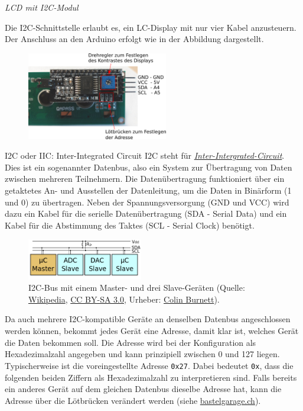 \newpage
\emph{LCD mit I2C-Modul}

Die I2C-Schnittstelle erlaubt es, ein LC-Display mit nur vier Kabel anzusteuern. Der Anschluss an den Arduino erfolgt wie in der Abbildung dargestellt.

\begin{figure}[H]
	\centering
	\includegraphics[width=0.55\textwidth]{./pics/i2c-modul-beschriftet.png}
\end{figure}

\begin{zsfg}{I2C oder IIC: Inter-Integrated Circuit}
	I2C steht für \emph{\href{https://de.wikipedia.org/wiki/I\%C2\%B2C}{Inter-Intergrated-Circuit}}. Dies ist ein sogenannter Datenbus, also ein System zur Übertragung von Daten zwischen mehreren Teilnehmern. Die Datenübertragung funktioniert über ein getaktetes An- und Ausstellen der Datenleitung, um die Daten in Binärform (1 und 0) zu übertragen. Neben der Spannungsversorgung (GND und VCC) wird dazu ein Kabel für die serielle Datenübertragung (SDA - Serial Data) und ein Kabel für die Abstimmung des Taktes (SCL - Serial Clock) benötigt.
	
	\begin{figure}
		\centering
		\vspace{-0.5\baselineskip}
		\includegraphics[width=0.45\textwidth]{./pics/i2c-info.png}
		\caption{I2C-Bus mit einem Master- und drei Slave-Geräten (Quelle: \href{https://de.wikipedia.org/wiki/Datei:I2C.svg}{Wikipedia}, \href{https://creativecommons.org/licenses/by-sa/3.0/deed.de}{CC BY-SA 3.0}, Urheber: \href{https://en.wikipedia.org/wiki/User:Cburnett}{Colin Burnett}).}
		\vspace{-0.5\baselineskip}
	\end{figure}
	Da auch mehrere I2C-kompatible Geräte an denselben Datenbus angeschlossen werden können, bekommt jedes Gerät eine Adresse, damit klar ist, welches Gerät die Daten bekommen soll. Die Adresse wird bei der Konfiguration als Hexadezimalzahl angegeben und kann prinzipiell zwischen 0 und 127 liegen. Typischerweise ist die voreingestellte Adresse \texttt{0x27}. Dabei bedeutet \texttt{0x}, dass die folgenden beiden Ziffern als Hexadezimalzahl zu interpretieren sind. Falls bereits ein anderes Gerät auf dem gleichen Datenbus dieselbe Adresse hat, kann die Adresse über die Lötbrücken verändert werden (siehe \href{https://www.bastelgarage.ch/i2c-schnittstelle-pcf8574-fur-lcd-display}{bastelgarage.ch}).
\end{zsfg}

